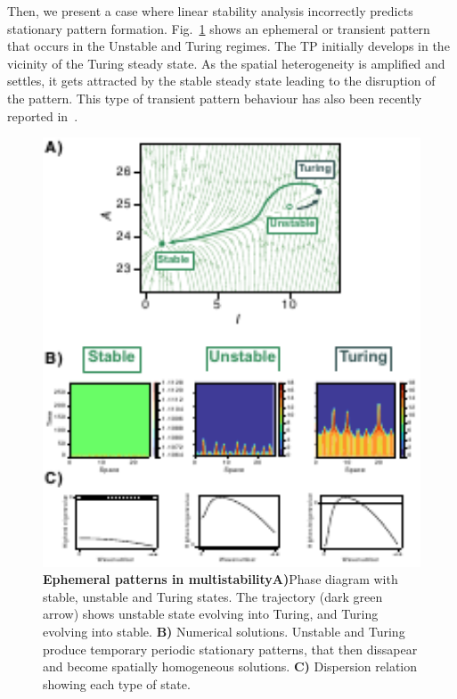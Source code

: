 Then, we present a case where linear stability analysis incorrectly predicts stationary pattern formation.
Fig.~\ref{fig:multistability2} shows an ephemeral or transient pattern that occurs in the Unstable and Turing regimes.
The TP initially develops in the vicinity of the Turing steady state.
As the spatial heterogeneity is amplified and settles, it gets attracted by the stable steady state leading to the disruption of the pattern.
This type of transient pattern behaviour has also been recently reported in~\cite{Krause2023}.

\begin{figure}[H] %
    \centering
    \begin{adjustbox}{center}
        \includegraphics[width=1\textwidth]{chapters/Chapter 1/multistability2} %
    \end{adjustbox}
    \caption{\textbf{Ephemeral patterns in multistability}\textbf{A)}Phase diagram with stable, unstable and Turing states. The trajectory (dark green arrow) shows unstable state evolving into Turing, and Turing evolving into stable. \textbf{B)} Numerical solutions. Unstable and Turing produce temporary periodic stationary patterns, that then dissapear and become spatially homogeneous solutions. \textbf{C)} Dispersion relation showing each type of state.}
    \label{fig:multistability2} %
\end{figure}

